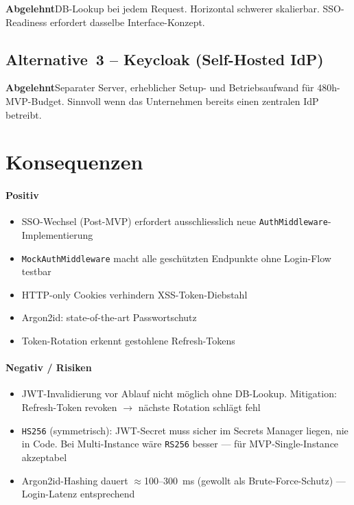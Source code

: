 \documentclass[a4paper, 11pt, oneside]{report}
\newcommand{\code}[1]{\texttt{\small #1}}
\newcommand{\ra}{$\rightarrow$\xspace}
\newcommand{\abgelehnt}{\colorbox{depbg}{\small\bfseries\color{warnframe}Abgelehnt}\;}
\begin{document}
\abgelehnt DB-Lookup bei jedem Request. Horizontal schwerer skalierbar.
SSO-Readiness erfordert dasselbe Interface-Konzept.

\subsection{Alternative~3 -- Keycloak (Self-Hosted IdP)}

\abgelehnt Separater Server, erheblicher Setup- und Betriebsaufwand für
480h-MVP-Budget. Sinnvoll wenn das Unternehmen bereits einen zentralen IdP betreibt.

\section{Konsequenzen}

\paragraph{Positiv}
\begin{itemize}
  \item SSO-Wechsel (Post-MVP) erfordert ausschliesslich neue
        \code{AuthMiddleware}-Implementierung
  \item \code{MockAuthMiddleware} macht alle geschützten Endpunkte ohne
        Login-Flow testbar
  \item HTTP-only Cookies verhindern XSS-Token-Diebstahl
  \item Argon2id: state-of-the-art Passwortschutz
  \item Token-Rotation erkennt gestohlene Refresh-Tokens
\end{itemize}

\paragraph{Negativ / Risiken}
\begin{itemize}
  \item JWT-Invalidierung vor Ablauf nicht möglich ohne DB-Lookup.
        Mitigation: Refresh-Token revoken \ra nächste Rotation schlägt fehl
  \item \code{HS256} (symmetrisch): JWT-Secret muss sicher im Secrets Manager
        liegen, nie in Code. Bei Multi-Instance wäre \code{RS256} besser ---
        für MVP-Single-Instance akzeptabel
  \item Argon2id-Hashing dauert $\approx$100--300~ms (gewollt als
        Brute-Force-Schutz) --- Login-Latenz entsprechend
\end{itemize}
\end{document}
